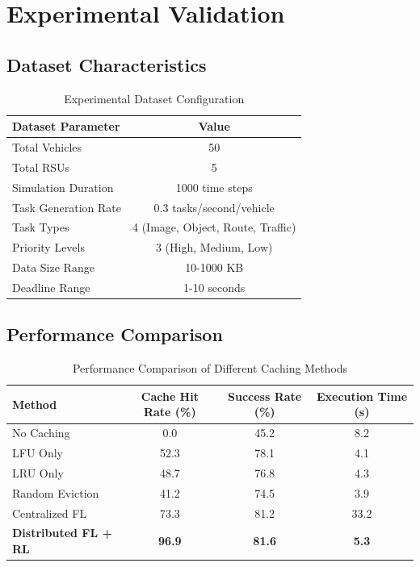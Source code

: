 \documentclass[11pt]{article}
\begin{document}
\section{Experimental Validation}

\subsection{Dataset Characteristics}

\begin{table}[h]
\centering
\begin{tabular}{@{}lc@{}}
\toprule
\textbf{Dataset Parameter} & \textbf{Value} \\
\midrule
Total Vehicles & 50 \\
Total RSUs & 5 \\
Simulation Duration & 1000 time steps \\
Task Generation Rate & 0.3 tasks/second/vehicle \\
Task Types & 4 (Image, Object, Route, Traffic) \\
Priority Levels & 3 (High, Medium, Low) \\
Data Size Range & 10-1000 KB \\
Deadline Range & 1-10 seconds \\
\bottomrule
\end{tabular}
\caption{Experimental Dataset Configuration}
\end{table}

\subsection{Performance Comparison}

\begin{table}[h]
\centering
\begin{tabular}{@{}lccc@{}}
\toprule
\textbf{Method} & \textbf{Cache Hit Rate (\%)} & \textbf{Success Rate (\%)} & \textbf{Execution Time (s)} \\
\midrule
No Caching & 0.0 & 45.2 & 8.2 \\
LFU Only & 52.3 & 78.1 & 4.1 \\
LRU Only & 48.7 & 76.8 & 4.3 \\
Random Eviction & 41.2 & 74.5 & 3.9 \\
Centralized FL & 73.3 & 81.2 & 33.2 \\
\textbf{Distributed FL + RL} & \textbf{96.9} & \textbf{81.6} & \textbf{5.3} \\
\bottomrule
\end{tabular}
\caption{Performance Comparison of Different Caching Methods}
\end{table}
\end{document}
